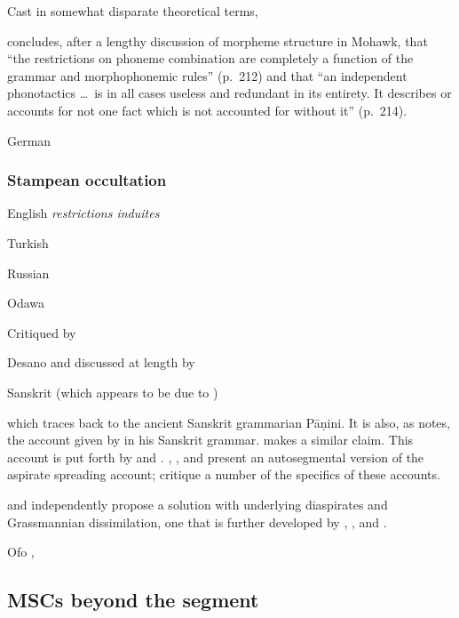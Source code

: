 Cast in somewhat disparate theoretical terms,

\citet[][]{Postal1968} concludes, after a lengthy discussion of morpheme structure in Mohawk, that ``the restrictions on phoneme combination are completely a function of the grammar and morphophonemic rules'' (p.~212) and that ``an independent phonotactics \ldots~is in all cases useless and redundant in its entirety. It describes or accounts for not one fact which is not accounted for without it'' (p.~214).

German
\citet[][94f.]{Shibatani1973} 
\citet[][82f.]{Hooper1973}
\citet{Clayton1976}

\subsubsection{Stampean occultation}

English
\citet[][28f.]{Stampe1979}
\citet[][205f.]{Dell1973} \emph{restrictions induites}

Turkish
\citet{Zimmer1969}

Russian
\citet[][]{Anderson1974}

Odawa
\citet{Kaye1974}

Critiqued by 
\citet[][310]{Clayton1976}
\citet[][73f.]{Kiparsky1982b}

Desano
\citet{Kaye1971} and discussed at length by \citet{Leben1973}


Sanskrit
(which appears to be due to \citealt{MacEachern1999})
\citet{Gallagher2010a}

which \citet{Sag1974} traces back to the ancient Sanskrit grammarian Pāṇini. It is also, as \citeauthor{Sag1974} notes, the account given by \citet[][\S141f.]{Whitney1889} in his Sanskrit grammar. \citet[][59f.]{Hoenigswald1965} makes a similar claim.  This account is put forth by \citet{Sag1974,Sag1976} and \citet{Schindler1976}. \citet{Stemberger1980}, \citet{Borowsky1983}, and \citet{Kaye1985} present an autosegmental version of the aspirate spreading account; \citet{Janda1989} critique a number of the specifics of these accounts.

\citet[][109f.]{Zwicky1965} and \citet[][\S3.2]{Kiparsky1965} independently propose a solution with underlying diaspirates and Grassmannian dissimilation, one that is further developed by \citet{Anderson1970}, \citet{Phelps1973}, \citet{Phelps1975} and \citet{Hoard1975}.

Ofo
\citet{DeReuse1981}
\citet[][38-42]{MacEachern1999}, 

\subsection{MSCs beyond the segment}

